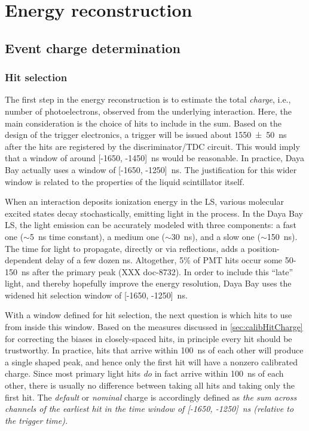 \documentclass[../thesis.tex]{subfiles}
\begin{document}
\section{Energy reconstruction}
\label{sec:reconEnergy}

\subsection{Event charge determination}
\label{sec:reconEnergyCharge}

\subsubsection{Hit selection}
\label{sec:reconHitSelection}

The first step in the energy reconstruction is to estimate the total
\emph{charge}, i.e., number of photoelectrons, observed from the underlying
interaction. Here, the main consideration is the choice of hits to include in
the sum. Based on the design of the trigger electronics, a trigger will be
issued about \SI{1550 \pm 50}{ns} after the hits are registered by the
discriminator/TDC circuit. This would imply that a window of around [-1650,
-1450]~ns would be reasonable. In practice, Daya Bay actually uses a window of
[-1650, -1250]~ns. The justification for this wider window is related to the
properties of the liquid scintillator itself.

When an interaction deposits ionization energy in the LS, various molecular
excited states decay stochastically, emitting light in the process. In the Daya
Bay LS, the light emission can be accurately modeled with three components: a
fast one ($\sim$5~ns time constant), a medium one ($\sim$30~ns), and a slow one
($\sim$150~ns). The time for light to propagate, directly or via reflections,
adds a position-dependent delay of a few dozen ns. Altogether, 5\% of PMT hits
occur some 50-150~ns after the primary peak (XXX doc-8732). In order to include
this ``late'' light, and thereby hopefully improve the energy resolution, Daya
Bay uses the widened hit selection window of [-1650, -1250]~ns.

With a window defined for hit selection, the next question is which hits to use
from inside this window. Based on the measures discussed in
\autoref{sec:calibHitCharge} for correcting the biases in closely-spaced hits,
in principle every hit should be trustworthy. In practice, hits that arrive
within 100~ns of each other will produce a single shaped peak, and hence only
the first hit will have a nonzero calibrated charge. Since most primary light
hits \emph{do} in fact arrive within 100~ns of each other, there is usually no
difference between taking all hits and taking only the first hit. The
\emph{default} or \emph{nominal} charge is accordingly defined as \emph{the sum
  across channels of the earliest hit in the time window of [-1650, -1250]~ns
  (relative to the trigger time).}
\end{document}
